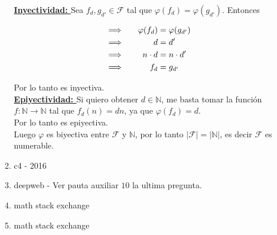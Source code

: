 \documentclass[letterpaper,12pt]{article}
\newcommand{\N}{\mathbb N}
\theoremstyle{plain}
\begin{document}
\begin{enumerate}[a)]
\begin{enumerate}[\bf P1.]
        \textbf{\underline{Inyectividad: }}Sea $f_{d},g_{d'} \in \mathcal{F}$ tal que $\varphi(f_{d})=\varphi(g_{d'})$. Entonces
        
         \begin{alignat}{2}
                &\Longrightarrow\quad &\varphi(f_d)  &= \varphi(g_{d'})\notag\\ 
                &\Longrightarrow  & d &= d' \notag\\  
                &\Longrightarrow & n\cdot d &= n\cdot d' \notag\\
                &\Longrightarrow & f_d &= g_{d'} \notag
            \end{alignat}
        
        Por lo tanto es inyectiva.\\
        
        \textbf{\underline{Epiyectividad: }} Si quiero obtener $d\in \N$, me basta tomar la función $f:\N \to \N$ tal que $f_{d}(n)=dn$, ya que $\varphi(f_d)=d$.\\
        Por lo tanto es epiyectiva.\\
        
        Luego $\varphi$ es biyectiva entre $\mathcal{F}$ y $\N$, por lo tanto $|\mathcal{F}|=|\N|$, es decir $\mathcal{F}$ es numerable.
        
        
        
        
        \item c4 - 2016
        \item deepweb - Ver pauta auxiliar $10$ la ultima pregunta.
        \item math stack exchange
        \item math stack exchange
        
    \end{enumerate}

    
    
\end{enumerate}
\end{document}
